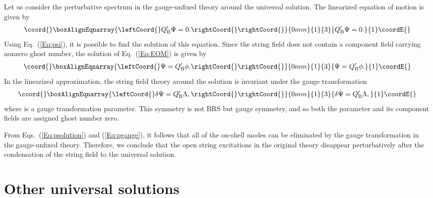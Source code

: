 \documentclass[a4paper,seceq,preprint]{ptptex}
\providecommand{\Q}{Q_{\rm B}}
\begin{document}
Let us consider the perturbative spectrum in the gauge-unfixed theory
around the 
universal solution. The linearized equation 
of motion is given by
\begin{eqnarray}\coord{}\boxAlignEqnarray{\leftCoord{}
\label{Eq:EOM}
 \Q'\Psi=0. \rightCoord{}
\rightCoord{}}{0mm}{1}{3}{
\Q'\Psi=0. 
}{1}\coordE{}\end{eqnarray}
Using Eq.~(\ref{Eq:psi}), it is possible to find the solution of this
equation. Since the string field does not contain a component field
carrying nonzero ghost number, the solution of Eq.~(\ref{Eq:EOM}) is
given by
\begin{eqnarray}\coord{}\boxAlignEqnarray{\leftCoord{}
\label{Eq:psolution}
 \Psi=\Q'\phi. \rightCoord{}
\rightCoord{}}{0mm}{1}{3}{
\Psi=\Q'\phi. 
}{1}\coordE{}\end{eqnarray}
In the linearized approximation, the string field theory around the
solution is invariant under the gauge transformation
\begin{eqnarray}\coord{}\boxAlignEqnarray{\leftCoord{}
\label{Eq:pgauge}
 \delta \Psi = \Q' \Lambda, \rightCoord{}
\rightCoord{}}{0mm}{1}{3}{
\delta \Psi = \Q' \Lambda, 
}{1}\coordE{}\end{eqnarray}
where \myHighlight{$\Lambda$}\coordHE{} is a gauge transformation parameter.
This symmetry is not BRS but gauge symmetry, and so both 
the parameter \myHighlight{$\Lambda$}\coordHE{} and its
component fields are assigned ghost number zero. 

From Eqs.~(\ref{Eq:psolution}) and (\ref{Eq:pgauge}), it follows that
all of the on-shell modes can be eliminated by the
gauge transformation in the gauge-unfixed theory.
Therefore, we conclude that the open string excitations in
the original theory disappear perturbatively after the condensation of
the string field to the universal solution.



\section{Other universal solutions}
\end{document}
